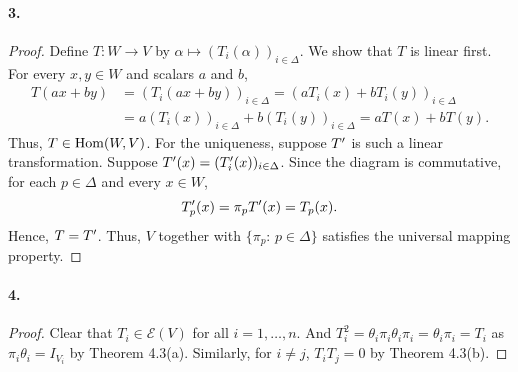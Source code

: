   \paragraph{3.}
  \begin{proof}
    Define $T:W\to V$ by $\alpha\mapsto (T_i(\alpha))_{i\in\Delta}$. We show that
    $T$ is linear first. For every $x,y\in W$ and scalars $a$ and $b$,
    \begin{align*}
      T(ax+by)&=(T_i(ax+by))_{i\in\Delta}=(aT_i(x)+bT_i(y))_{i\in\Delta}\\
      &=a(T_i(x))_{i\in\Delta}+b(T_i(y))_{i\in\Delta}=aT(x)+bT(y).
    \end{align*}
    Thus, $T\in\operatorname{Hom}(W,V)$. For the uniqueness, suppose $T^\prime$ is such a linear
    transformation. Suppose $T^\prime(x)=(T^\prime_i(x))_{i\in\Delta}$. Since the diagram
    is commutative, for each $p\in\Delta$ and every $x\in W$,
    \[
      T^\prime_p(x)=\pi_pT^\prime(x)=T_p(x).
    \]
    Hence, $T=T^\prime$. Thus, $V$ together with $\{\pi_p:\,p\in\Delta\}$ satisfies
    the universal mapping property.
  \end{proof}
  
  \paragraph{4.}
  \begin{proof}
    Clear that $T_i\in\mathscr{E}(V)$ for all $i=1,\dots,n$. And $T_i^2=\theta_i
    \pi_i\theta_i\pi_i=\theta_i\pi_i=T_i$ as $\pi_i\theta_i=I_{V_i}$ by Theorem 
    4.3(a). Similarly, for $i\ne j$, $T_iT_j=0$ by Theorem 4.3(b). 
  \end{proof}


